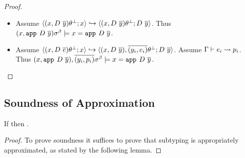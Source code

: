 \begin{proof}
\begin{itemize}
\item 
Assume
	$\track{(x, D\ \overline{y})\tsub{}}{x}
	\hookrightarrow
	\track{(x, D\ \overline{y})\tsub{}}{D\ \overline{y}}$.
Thus  
  $(x,\texttt{app}^{}_{}\ {D}\ {\overline{y}})\sigma^\beta 
    \models x = \texttt{app}^{}_{}\ {D}\ {\overline{y}}$. 

\item 
Assume
	$\track{(x, D\ \overline{e})\tsub{}}{x}
	\hookrightarrow
	\track{(x, D\ \overline{y}), \overline{(y_i, e_i)}\tsub{}}{D\ \overline{y}}$.
Assume 
  $ \Gamma\vdash e_i \rightsquigarrow p_i $.
Thus  
  $(x,\texttt{app}^{}_{}\ {D}\ {\overline{y}}), \overline{(y_i, p_i)}\sigma^\beta 
    \models x = \texttt{app}^{}_{}\ {D}\ {\overline{y}}$. 
\end{itemize}
\end{proof}

\subsection{Soundness of Approximation}
%
\begin{theorem}
If  then .
\end{theorem}
%
\begin{proof}
To prove soundness it suffices to prove that subtyping is appropriately approximated, 
as stated by the following lemma.
\end{proof}

